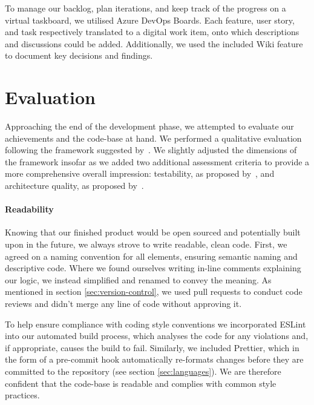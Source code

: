 \documentclass[sigconf]{acmart}
\begin{document}
To manage our backlog, plan iterations, and keep track of the progress on a virtual taskboard, we utilised Azure DevOps Boards. Each feature, user story, and task respectively translated to a digital work item, onto which descriptions and discussions could be added. Additionally, we used the included Wiki feature to document key decisions and findings.%


\section{Evaluation}
\label{sec:evaluation}


Approaching the end of the development phase, we attempted to evaluate our achievements and the code-base at hand. We performed a qualitative evaluation following the framework suggested by~\cite{evaluate-codebase}. We slightly adjusted the dimensions of the framework insofar as we added two additional assessment criteria to provide a more comprehensive overall impression: testability, as proposed by~\cite{evaluate-criteria}, and architecture quality, as proposed by~\cite{evaluate-achitecture}.


\paragraph{Readability}

Knowing that our finished product would be open sourced and potentially built upon in the future, we always strove to write readable, clean code. First, we agreed on a naming convention for all elements, ensuring semantic naming and descriptive code. Where we found ourselves writing in-line comments explaining our logic, we instead simplified and renamed to convey the meaning. As mentioned in section \ref{sec:version-control}, we used pull requests to conduct code reviews and didn't merge any line of code without approving it.

To help ensure compliance with coding style conventions we incorporated ESLint into our automated build process, which analyses the code for any violations and, if appropriate, causes the build to fail. Similarly, we included Prettier, which in the form of a pre-commit hook automatically re-formats changes before they are committed to the repository (see section \ref{sec:languages}). We are therefore confident that the code-base is readable and complies with common style practices.
\end{document}
